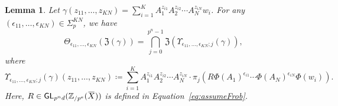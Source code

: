 \documentclass[letterpaper, 11pt, thm-restate]{article}
\numberwithin{equation}{section}
\newcommand{\Zpe}{\mathbb{Z}_{/p^e}}
\newcommand{\GL}{\mathsf{GL}}
\newcommand{\mZ}{\mathfrak{Z}}
\newcommand{\oX}{\mkern 1.5mu\overline{\mkern-1.5mu X \mkern-1.5mu}\mkern 1.5mu}
\newtheorem{lem}[thrm]{Lemma}
\theoremstyle{definition}
\theoremstyle{definition}
\theoremstyle{definition}
\begin{document}
\begin{lem}\label{lem:shiftgamma}
    Let 
    $
        \gamma(z_{11}, \ldots, z_{KN}) = \sum_{i = 1}^K A_1^{z_{i1}} A_2^{z_{i2}} \cdots A_N^{z_{iN}} w_i
    $.
    For any $(\epsilon_{11}, \ldots, \epsilon_{KN}) \in \Sigma_p^{KN}$, we have
    \[
    \Theta_{\epsilon_{11}, \ldots, \epsilon_{KN}}(\mZ(\gamma)) = \bigcap_{j = 0}^{p^n - 1} \mZ\left(\Upsilon_{\epsilon_{11}, \ldots, \epsilon_{KN}; j}(\gamma)\right),
    \]
    where
    \begin{equation}\label{eq:defUpsilon}
    \Upsilon_{\epsilon_{11}, \ldots, \epsilon_{KN}; j}(\gamma)(z_{11}, \ldots, z_{KN}) \coloneqq \sum_{i=1}^K A_1^{z_{i1}} A_2^{z_{i2}} \cdots A_N^{z_{iN}} \cdot \pi_j\left(R \Phi(A_1)^{\epsilon_{i1}} \cdots \Phi(A_N)^{\epsilon_{iN}} \Phi(w_i)\right).
    \end{equation}
    Here, $R \in \GL_{p^nd}(\Zpe(\oX))$ is defined in Equation~\eqref{eq:assumeFrob}.
\end{lem}
\end{document}
